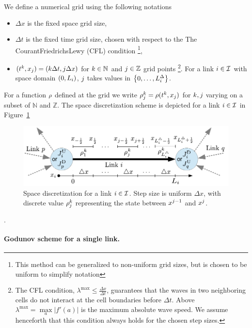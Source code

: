 We define a numerical grid using the following notations 
\begin{itemize}
\item $\Delta x$ is the fixed space grid size,
\item $\Delta t$ is the fixed time grid size, chosen with respect to the
The Courant\textendash{}Friedrichs\textendash{}Lewy (CFL) condition%
\footnote{This method can be generalized to non-uniform grid sizes, but is chosen
to be uniform to simplify notation%
}, 
\item $(t^{k},x_{j})=(k\Delta t,j\Delta x)$ for $k\in\mathbb{N}$
and $j\in\mathbb{Z}$ grid points%
\footnote{The CFL condition, $\lambda^{\max}\le\frac{\Delta x}{\Delta t}$,
guarantees that the waves in two neighboring cells do not interact
at the cell boundaries before $\Delta t$. Above $\lambda^{\max}=\underset{a}{\max}|f'\left(a\right)|$
is the maximum absolute wave speed. We assume henceforth that this
condition always holds for the chosen step sizes.%
}. For a link $i\in\mathcal{I}$ with space domain $\left(0,\length_{\link}\right)$,
$j$ takes values in $\intrange 0{\length_{\link}^{\Delta}}$.
\end{itemize}
For a function $\rho$ defined at the grid we write $\rho_{j}^{k}=\rho(t^{k},x_{j})$
for $k,j$ varying on a subset of $\mathbb{N}$ and $\mathbb{Z}$.
The space discretization scheme is depicted for a link $i\in\mathcal{I}$
in Figure~\ref{fig:Space-discretization-for}
\begin{figure}
\begin{centering}
\includegraphics[width=0.6\columnwidth]{figs-gen/dx}
\par\end{centering}

\caption{Space discretization for a link $i\in\mathcal{I}$. Step size is uniform
$\Delta x$, with discrete value $\rho_{j}^{k}$ representing
the state between $x^{j-1}$ and $x^{j}$.\label{fig:Space-discretization-for}}


\end{figure}
.


\paragraph{Godunov scheme for a single link.}

